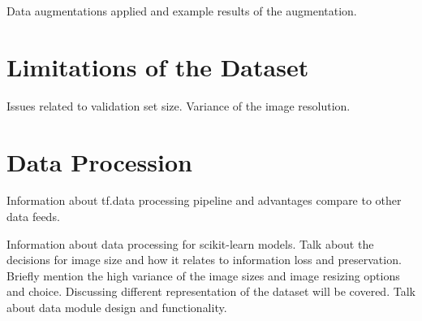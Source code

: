 Data augmentations applied and example results of the augmentation.

\section{Limitations of the Dataset}
Issues related to validation set size. Variance of the image resolution.

\section{Data Procession}
Information about tf.data processing pipeline and advantages compare to other data feeds.

Information about data processing for scikit-learn models.
Talk about the decisions for image size and how it relates to information loss and preservation. Briefly mention the high variance of the image sizes and image resizing options and choice.
Discussing different representation of the dataset will be covered.
Talk about data module design and functionality.
\clearpage